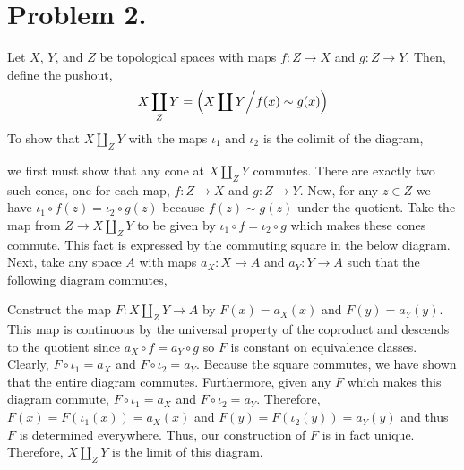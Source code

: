 \documentclass[12pt]{extarticle}
\begin{document}
\section*{Problem 2.}

Let $X$, $Y$, and $Z$ be topological spaces with maps $f : Z \to X$ and $g : Z \to Y$. Then, define the pushout,
\[ X \coprod_Z Y =  \left(X \coprod Y \middle/ f(x) \sim g(x) \right) \]
To show that $X \coprod_Z Y$ with the maps $\iota_1$ and $\iota_2$ is the colimit of the diagram,
\begin{center}
\end{center}
we first must show that any cone at $X \coprod_Z Y$ commutes. There are exactly two such cones, one for each map,  $f : Z \to X$ and $g : Z \to Y$. Now, for any 
$z \in Z$ we have $\iota_1 \circ f(z) = \iota_2 \circ g(z)$ because $f(z) \sim g(z)$ under the quotient. Take the map from $Z \to X \coprod_Z Y$ to be given by $\iota_1 \circ f = \iota_2 \circ g$ which makes these cones commute. This fact is expressed by the commuting square in the below diagram. Next,
take any space $A$ with maps $a_X : X \to A$ and $a_Y : Y \to A$ such that the following diagram commutes,
\begin{center}
\end{center}
Construct the map $F : X \coprod_Z Y \to A$ by $F(x) = a_X(x)$ and $F(y) = a_Y(y)$. This map is continuous by the universal property of the coproduct and descends to the quotient since $a_X \circ f = a_Y \circ g$ so $F$ is constant on equivalence classes. Clearly, $F \circ \iota_1 = a_X$ and $F \circ \iota_2 = a_Y$. Because the square commutes, we have shown that the entire diagram commutes. 
Furthermore, given any $F$ which makes this diagram commute, $F \circ \iota_1 = a_X$ and $F \circ \iota_2 = a_Y$. Therefore, $F(x) = F(\iota_1(x)) = a_X(x)$ and $F(y) = F(\iota_2(y)) = a_Y(y)$ and thus $F$ is determined everywhere. Thus, our construction of $F$ is in fact unique. Therefore, $X \coprod_Z Y$ is the limit of this diagram. 
\end{document}
